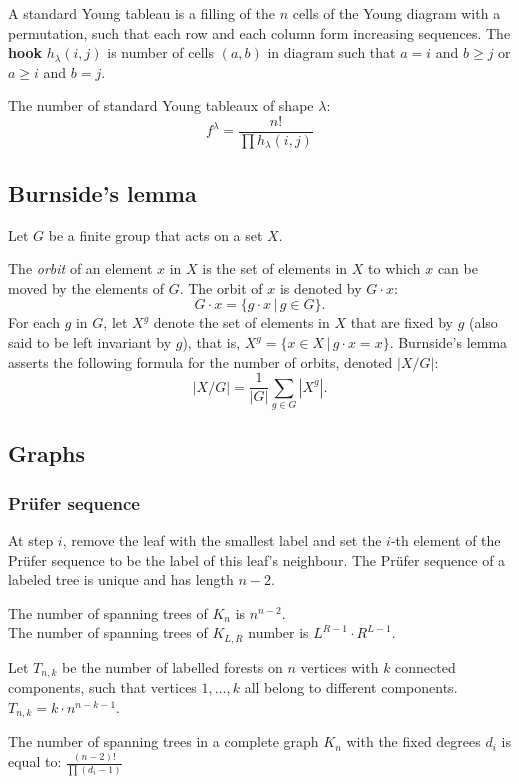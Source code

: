 A standard Young tableau is a filling of the $n$ cells of the Young diagram with a permutation, 
such that each row and each column form increasing sequences. 
The \textbf{hook} $h_{\lambda}(i, j)$ is number of cells $(a, b)$ in diagram such that
$a = i$ and $b \ge j$ or $a \ge i$ and $b = j$.

The number of standard Young tableaux of shape $\lambda$:
$$f^\lambda = \frac{n!}{\prod h_{\lambda}(i, j)}$$


\subsection*{Burnside's lemma}

Let $G$ be a finite group that acts on a set $X$.

The \textit{orbit} of an element $x$ in $X$ is the set of elements
in $X$ to which $x$ can be moved by the elements of $G$.
The orbit of $x$ is denoted by $G \cdot x$:
 $$G \cdot x = \{g \cdot x\, |\, g \in G\}.$$
For each $g$ in $G$, let $X^g$ denote the set of elements
in $X$ that are fixed by $g$ (also said to be left invariant by $g$),
that is, $X^g = \{ x \in X\, |\, g \cdot x = x \}$.
Burnside's lemma asserts the following formula for the number of orbits,
denoted $|X/G|$:
$$|X/G| = \frac{1}{|G|} \sum_{g \in G} |X^g|.$$

\subsection*{Graphs}

\subsubsection*{Prüfer sequence}
At step $i$, remove the leaf with the smallest label and set the $i$-th 
element of the Prüfer sequence to be the label of this leaf's neighbour.
The Prüfer sequence of a labeled tree is unique and has length $n - 2$.

The number of spanning trees of $K_n$ is $n^{n - 2}$.\\
The number of spanning trees of $K_{L, R}$ number is $L^{R - 1} \cdot R^{L - 1}$.

Let $T_{n, k}$ be the number of labelled forests on $n$ vertices with $k$ connected components, 
such that vertices $1, \dots, k$ all belong to different components. 
$T_{n,k} = k \cdot n^{n - k - 1}$.

The number of spanning trees in a complete graph $K_{n}$ with the fixed degrees
$d_{i}$ is equal to:
$ \frac{(n - 2)!}{\prod(d_i - 1)} $

